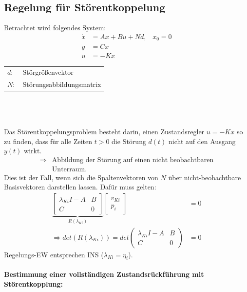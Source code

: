 \documentclass[a4paper,twocolumn,10pt]{article}
\begin{document}
\subsection{Regelung für Störentkoppelung}
Betrachtet wird folgendes System:
\begin{align*}
\dot{x}&=Ax+Bu+Nd,\;\;\;x_0=0\\
y&=Cx\\
u&=-Kx
\end{align*}
\begin{tabular}{ll}
$d:$ & Störgrößenvektor\\
$N:$ & Störungsabbildungsmatrix
\end{tabular}\\\\\\
Das Störentkoppelungsproblem besteht darin, einen Zustandsregler $u=-Kx$ so zu finden, dass für alle Zeiten $t>0$ die Störung $d(t)$ nicht auf den Ausgang $y(t)$ wirkt.
\begin{align*}
\Rightarrow&\text{Abbildung der Störung auf einen nicht beobachtbaren}\\
&\text{Unterraum.}
\end{align*}
Dies ist der Fall, wenn sich die Spaltenvektoren von $N$ über nicht-beobachtbare Basisvektoren darstellen lassen. Dafür muss gelten:
\begin{align*}
\underbrace{\begin{bmatrix}\lambda_{Ki}I-A & B \\ C & 0\end{bmatrix}}_{R(\lambda_{Ki})}\begin{bmatrix}v_{Ki} \\ p_i\end{bmatrix}&=0\\
\Rightarrow det(R(\lambda_{Ki}))=det\begin{pmatrix}\lambda_{Ki}I-A & B \\ C & 0\end{pmatrix}&=0
\end{align*}
Regelungs-EW entsprechen INS ($\lambda_{Ki}=\eta_i$).\\\\
\textbf{Bestimmung einer vollständigen Zustandsrückführung mit Störentkopplung:}
\end{document}
